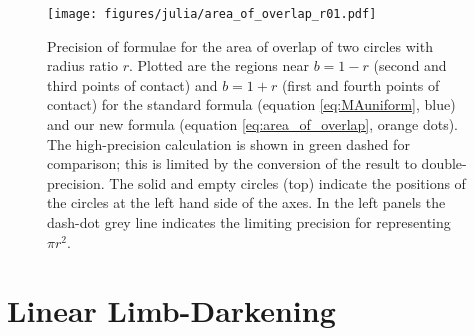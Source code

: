 \documentclass[modern]{aastex61}
\begin{document}
\begin{figure}
    \begin{centering}
    \texttt{[image: figures/julia/area\_of\_overlap\_r01.pdf]}
    \caption{Precision of formulae for the area of overlap of two circles with
    radius ratio $r$.  Plotted are the regions near $b=1-r$ (second and third
    points of contact) and $b=1+r$ (first and fourth points of contact) for
    the standard formula (equation \ref{eq:MAuniform}, blue) and our new formula
    (equation \ref{eq:area_of_overlap}, orange dots).
    The high-precision calculation is shown in green dashed for comparison; this
    is limited by the conversion of the result to double-precision. The
    solid and empty circles (top) indicate the positions of the circles at the left
    hand side of the axes.  In the left panels the dash-dot grey line indicates the
    limiting precision for representing $\pi r^2$. }\label{fig:overlap_precision}
    \end{centering}
\end{figure}

\section{Linear Limb-Darkening}
\label{sec:reparam}
\end{document}

